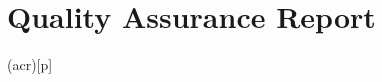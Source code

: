 \documentclass[a4paper,twoside,openright,makeidx,12pt]{book}
\begin{document}
\newpage
\chapter{Quality Assurance Report}
\label{Sec:QR-QAR}


\newpage
\printglosstex(acr)[p]



\listoffigures
\listoftables
\cleardoublepage
%
%
\cleardoublepage
\end{document}
